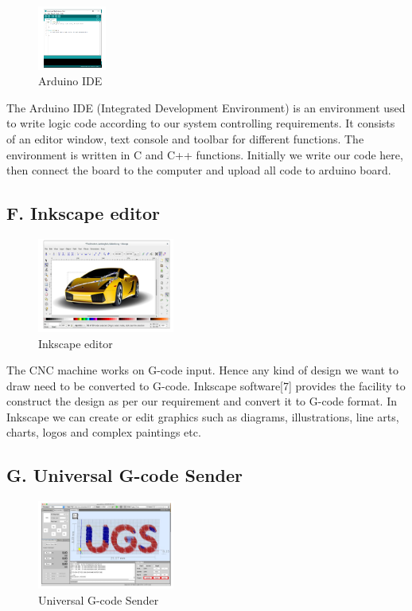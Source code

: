 \documentclass[conference]{IEEEtran}
\begin{document}
\begin{figure}[h]
    \centering
    \includegraphics[width=0.20\textwidth]{arduino.png}
    \caption{Arduino IDE}
\end{figure}

The Arduino IDE (Integrated Development Environment)
is an environment used to write logic code according to our
system controlling requirements. It consists of an editor
window, text console and toolbar for different functions. The
environment is written in C and C++ functions. Initially we
write our code here, then connect the board to the computer and
upload all code to arduino board.

\subsection*{\textbf{F. Inkscape editor}}

\begin{figure}[h]
    \centering
    \includegraphics[width=0.40\textwidth]{ink.png}
    \caption{Inkscape editor}
\end{figure}

The CNC machine works on G-code input. Hence any kind of
design we want to draw need to be converted to G-code.
Inkscape software[7] provides the facility to construct the
design as per our requirement and convert it to G-code format.
In Inkscape we can create or edit graphics such as diagrams,
illustrations, line arts, charts, logos and complex paintings etc.

\subsection*{\textbf{G. Universal G-code Sender}}

\begin{figure}[h]
    \centering
    \includegraphics[width=0.40\textwidth]{universal.png}
    \caption{Universal G-code Sender}
\end{figure}
\end{document}
